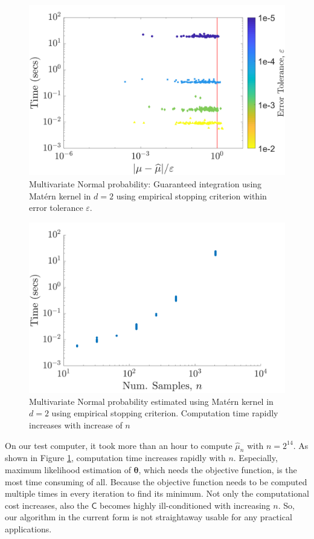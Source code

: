 \documentclass{iitthesis}          %
\newcommand{\bm}[1]{\boldsymbol{#1}}
\newcommand{\vtheta}{{\bm{\theta}}}
\newcommand{\mC}{\mathsf{C}}
\newcommand{\hmu}{\widehat{\mu}}
\begin{document}
\begin{figure}
	\centering
	\includegraphics[width=0.9\linewidth]{MVN_guaranteed_time_Matern_d2_2018-Aug-31}
	\caption{Multivariate Normal probability: Guaranteed integration using Mat\'ern kernel in $d=2$ using empirical stopping criterion within error tolerance $\varepsilon$.}
	\label{fig:MVN_Metern_d2b2}
\end{figure}
\begin{figure}
	\centering
	\includegraphics[width=0.9\linewidth]{MVN_rapid_n_vs_time_Matern_d2_2018-Aug-31}
	\caption{Multivariate Normal probability estimated using Mat\'ern kernel in $d=2$ using empirical stopping criterion. Computation time rapidly increases with increase of $n$}
	\label{fig:MVN_Metern_d2b2_time_growth}
\end{figure}

On our test computer, it took more than an hour to compute $\hmu_n$ with $n=2^{14}$. As shown in Figure \ref{fig:MVN_Metern_d2b2}, computation time increases rapidly with $n$. 
Especially, maximum likelihood estimation of $\vtheta$, which needs the objective function, is the most time consuming of all. 
Because the objective function needs to be computed multiple times in every iteration to find its minimum. 
Not only the computational cost increases, also the $\mC$ becomes highly ill-conditioned with increasing $n$.
So, our algorithm in the current form is not straightaway usable for any practical applications.
\end{document}
